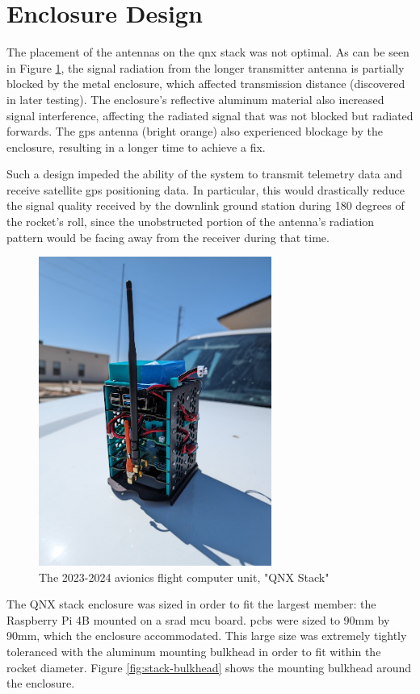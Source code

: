 \section{Enclosure Design}

The placement of the antennas on the \gls{qnx} stack was not optimal. As can be seen in Figure
\ref{fig:preflight-stack}, the signal radiation from the longer transmitter antenna is partially blocked by the metal
enclosure, which affected transmission distance (discovered in later testing). The enclosure's reflective aluminum
material also increased signal interference, affecting the radiated signal that was not blocked but radiated forwards.
The \gls{gps} antenna (bright orange) also experienced blockage by the enclosure, resulting in a longer time to achieve
a fix.

Such a design impeded the ability of the system to transmit telemetry data and receive satellite \gls{gps} positioning
data. In particular, this would drastically reduce the signal quality received by the downlink ground station during
180 degrees of the rocket's roll, since the unobstructed portion of the antenna's radiation pattern would be facing
away from the receiver during that time.

\begin{figure}[H]
    \center
    \includegraphics[width=3in]{assets/images/stack.jpg}
    \caption{The 2023-2024 avionics flight computer unit, "QNX Stack"}
    \label{fig:preflight-stack}
\end{figure}

The QNX stack enclosure was sized in order to fit the largest member: the Raspberry Pi 4B mounted on a \gls{srad}
\gls{mcu} board. \Glspl{pcb} were sized to 90mm by 90mm, which the enclosure accommodated. This large size was
extremely tightly toleranced with the aluminum mounting bulkhead in order to fit within the rocket diameter. Figure
\ref{fig:stack-bulkhead} shows the mounting bulkhead around the enclosure.

